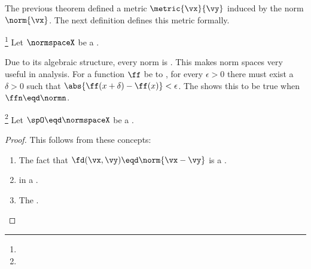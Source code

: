 The previous theorem defined a metric $\metric{\vx}{\vy}$ induced by the norm $\norm{\vx}$.
The next definition defines this metric formally.
\begin{definition}
\label{def:d=norm}
\footnote{
  }
Let $\normspaceX$ be a  .
\end{definition}


Due to its algebraic structure, every norm is  .
This makes norm spaces very useful in analysis.
For a function $\ff$ be to , for every $\epsilon>0$ there must exist a $\delta>0$ such that 
$\abs{\ff(x+\delta)-\ff(x)}<\epsilon$.
The   shows this to be true when $\ffn\eqd\normn$.


\begin{corollary}
\label{cor:norm_continuous}
\footnote{
  }
Let $\spO\eqd\normspaceX$ be a  .
\end{corollary}
\begin{proof}
This follows from these concepts:
\begin{enumerate}
  \item The fact that $\fd(\vx,\vy)\eqd\norm{\vx-\vy}$ is a  .
  \item {} in a . %
  \item The  .
\end{enumerate}
\end{proof}


